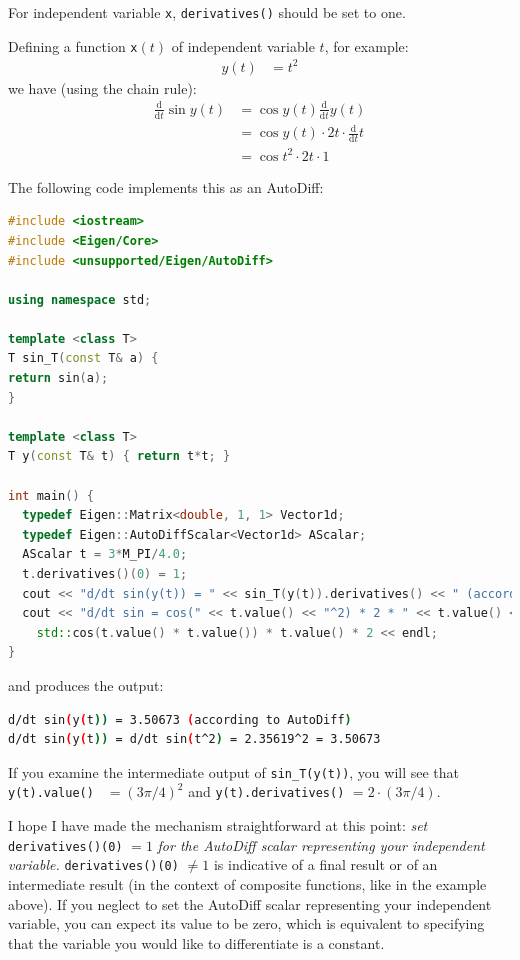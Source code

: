 \documentclass[letterpaper, 12 pt, onecolumn, journal]{IEEEtran}  %
\begin{document}
For independent variable \texttt{x}, \texttt{derivatives()} should be set to one.

Defining a function \texttt{x}$(t)$ of independent variable $t$, for example:
\begin{align}
y(t) & = t^2
\end{align}
we have (using the chain rule):
\begin{align}
\frac{\textrm{d}}{\textrm{d}t} \sin y(t) & = \cos y(t) \frac{\textrm{d}}{\textrm{d}t} y(t) \\
& = \cos y(t) \cdot 2t \cdot \frac{\textrm{d}}{\textrm{d}t} t \\
& = \cos t^2 \cdot 2t \cdot 1
\end{align}

The following code implements this as an AutoDiff:
\begin{lstlisting}[language=C++]
#include <iostream>
#include <Eigen/Core>
#include <unsupported/Eigen/AutoDiff>

using namespace std;

template <class T>
T sin_T(const T& a) {
return sin(a);
}

template <class T>
T y(const T& t) { return t*t; }

int main() {
  typedef Eigen::Matrix<double, 1, 1> Vector1d;
  typedef Eigen::AutoDiffScalar<Vector1d> AScalar;
  AScalar t = 3*M_PI/4.0;
  t.derivatives()(0) = 1;
  cout << "d/dt sin(y(t)) = " << sin_T(y(t)).derivatives() << " (according to AutoDiff)" << endl;
  cout << "d/dt sin = cos(" << t.value() << "^2) * 2 * " << t.value() << " = " <<
    std::cos(t.value() * t.value()) * t.value() * 2 << endl;
}
\end{lstlisting}
and produces the output:
\begin{lstlisting}[language=bash]
d/dt sin(y(t)) = 3.50673 (according to AutoDiff)
d/dt sin(y(t)) = d/dt sin(t^2) = 2.35619^2 = 3.50673
\end{lstlisting}
If you examine the intermediate output of \texttt{sin\_T(y(t))}, you will see that \texttt{y(t).value() }
$ = (3\pi/4)^2$ and \texttt{y(t).derivatives()} $= 2 \cdot (3\pi/4)$.

\vspace{0.5cm}
I hope I have made the mechanism straightforward at this point: \emph{set} \texttt{derivatives()(0)} $= 1$ \emph{for the AutoDiff scalar representing your independent variable.} \texttt{derivatives()(0)} $\neq 1$ is indicative of a final result or of an intermediate result (in the context of composite functions, like in the example above). If you neglect to set the AutoDiff scalar representing your independent variable, you can expect its value to be zero, which is equivalent to specifying that the variable you would like to differentiate is a constant.
\end{document}
